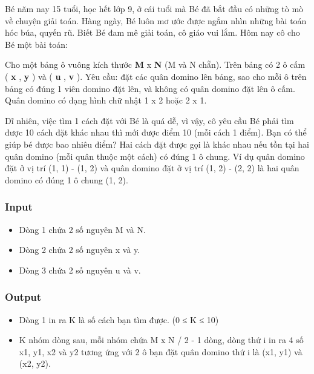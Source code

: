 



   Bé năm nay 15 tuổi, học hết lớp 9, ở cái tuổi mà Bé đã bắt đầu có những tò mò về chuyện giải toán. Hàng ngày, Bé luôn mơ ước được ngắm nhìn những bài toán hóc búa, quyến rũ. Biết Bé đam mê giải toán, cô giáo vui lắm. Hôm nay cô cho Bé một bài toán:  

   Cho một bảng ô vuông kích thước   \textbf{    M   }   x   \textbf{    N   }   (M và N chẵn). Trên bảng có 2 ô cấm (   \textbf{    x   }   ,   \textbf{    y   }   ) và (   \textbf{    u   }   ,   \textbf{    v   }   ). Yêu cầu: đặt các quân domino lên bảng, sao cho mỗi ô trên bảng có đúng 1 viên domino đặt lên, và không có quân domino đặt lên ô cấm. Quân domino có dạng hình chữ nhật 1 x 2 hoặc 2 x 1.   





   Dĩ nhiên, việc tìm 1 cách đặt với Bé là quá dễ, vì vậy, cô yêu cầu Bé phải tìm được 10 cách đặt khác nhau thì mới được điểm 10 (mỗi cách 1 điểm). Bạn có thể giúp bé được bao nhiêu điểm? Hai cách đặt được gọi là khác nhau nếu tồn tại hai quân domino (mỗi quân thuộc một cách) có đúng 1 ô chung. Ví dụ quân domino đặt ở vị trí (1, 1) - (1, 2) và quân domino đặt ở vị trí (1, 2) - (2, 2) là hai quân domino có đúng 1 ô chung (1, 2).  

\subsubsection{   Input  }
\begin{itemize}
	\item     Dòng 1 chứa 2 số nguyên M và N.   
	\item     Dòng 2 chứa 2 số nguyên x và y.   
	\item     Dòng 3 chứa 2 số nguyên u và v.   
\end{itemize}

\subsubsection{   Output  }
\begin{itemize}
	\item     Dòng 1 in ra K là số cách bạn tìm được. (0 ≤ K ≤ 10)   
	\item     K nhóm dòng sau, mỗi nhóm chứa M x N / 2 - 1 dòng, dòng thứ i in ra 4 số x1, y1, x2 và y2 tương ứng với 2 ô bạn đặt quân domino thứ i là (x1, y1) và (x2, y2).   
\end{itemize}

